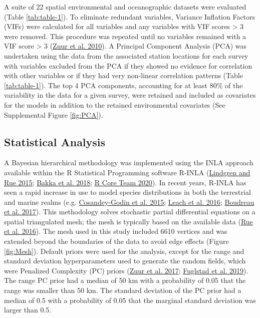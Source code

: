 \documentclass[
]{article}
\begin{document}
A suite of 22 spatial environmental and oceanographic datasets were evaluated (Table \ref{tab:table-1}). To eliminate redundant variables, Variance Inflation Factors (VIFs) were calculated for all variables and any variables with VIF scores \textgreater{} 3 were removed. This procedure was repeated until no variables remained with a VIF score \textgreater{} 3 (\protect\hyperlink{ref-zuurProtocolDataExploration2010}{Zuur et al. 2010}). A Principal Component Analysis (PCA) was undertaken using the data from the associated station locations for each survey with variables excluded from the PCA if they showed no evidence for correlation with other variables or if they had very non-linear correlation patterns (Table \ref{tab:table-1}). The top 4 PCA components, accounting for at least 80\% of the variability in the data for a given survey, were retained and included as covariates for the models in addition to the retained environmental covariates (See Supplemental Figure \ref{fig:PCA}).

\hypertarget{statistical-analysis}{%
\subsection{Statistical Analysis}\label{statistical-analysis}}

A Bayesian hierarchical methodology was implemented using the INLA approach available within the R Statistical Programming software R-INLA (\protect\hyperlink{ref-lindgrenBayesianSpatialModelling2015}{Lindgren and Rue 2015}; \protect\hyperlink{ref-bakkaSpatialModellingRINLA2018}{Bakka et al. 2018}; \protect\hyperlink{ref-rcoreteamLanguageEnvironmentStatistical2020}{R Core Team 2020}). In recent years, R-INLA has seen a rapid increase in use to model species distributions in both the terrestrial and marine realms (e.g. \protect\hyperlink{ref-cosandey-godinApplyingBayesianSpatiotemporal2015}{Cosandey-Godin et al. 2015}; \protect\hyperlink{ref-leachModellingInfluenceBiotic2016}{Leach et al. 2016}; \protect\hyperlink{ref-boudreauConnectivityPersistenceLoss2017}{Boudreau et al. 2017}). This methodology solves stochastic partial differential equations on a spatial triangulated mesh; the mesh is typically based on the available data (\protect\hyperlink{ref-rueBayesianComputingINLA2016}{Rue et al. 2016}). The mesh used in this study included 6610 vertices and was extended beyond the boundaries of the data to avoid edge effects (Figure \ref{fig:Mesh}). Default priors were used for the analysis, except for the range and standard deviation hyperparameters used to generate the random fields, which were Penalized Complexity (PC) priors (\protect\hyperlink{ref-zuurBeginnerGuideSpatial2017}{Zuur et al. 2017}; \protect\hyperlink{ref-fuglstadConstructingPriorsThat2019}{Fuglstad et al. 2019}). The range PC prior had a median of 50 km with a probability of 0.05 that the range was smaller than 50 km. The standard deviation of the PC prior had a median of 0.5 with a probability of 0.05 that the marginal standard deviation was larger than 0.5.
\end{document}
